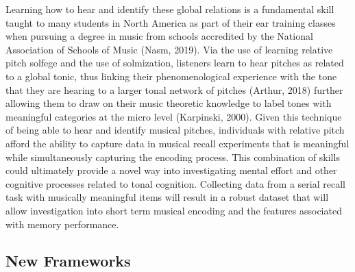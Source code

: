 \documentclass[english,man,floatsintext]{apa6}
\begin{document}
Learning how to hear and identify these global relations is a fundamental skill taught to many students in North America as part of their ear training classes when pursuing a degree in music from schools accredited by the National Association of Schools of Music (Nasm, 2019).
Via the use of learning relative pitch solfege and the use of solmization, listeners learn to hear pitches as related to a global tonic, thus linking their phenomenological experience with the tone that they are hearing to a larger tonal network of pitches (Arthur, 2018) further allowing them to draw on their music theoretic knowledge to label tones with meaningful categories at the micro level (Karpinski, 2000).
Given this technique of being able to hear and identify musical pitches, individuals with relative pitch afford the ability to capture data in musical recall experiments that is meaningful while simultaneously capturing the encoding process.
This combination of skills could ultimately provide a novel way into investigating mental effort and other cognitive processes related to tonal cognition.
Collecting data from a serial recall task with musically meaningful items will result in a robust dataset that will allow investigation into short term musical encoding and the features associated with memory performance.

\hypertarget{new-frameworks}{%
\subsection{New Frameworks}\label{new-frameworks}}
\end{document}
